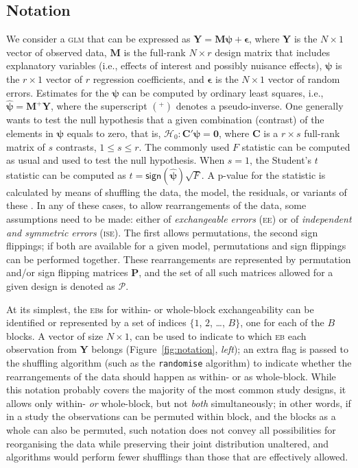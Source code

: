 \subsection{Notation}
\label{sec:ptree:notation}

We consider a \textsc{glm} that can be expressed as $\mathbf{Y} = \mathbf{M}\boldsymbol{\psi} + \boldsymbol{\epsilon}$, where $\mathbf{Y}$ is the $N \times 1$ vector of observed data, $\mathbf{M}$ is the full-rank $N \times r$ design matrix that includes explanatory variables (i.e., effects of interest and possibly nuisance effects), $\boldsymbol{\psi}$ is the $r \times 1$ vector of $r$ regression coefficients, and $\boldsymbol{\epsilon}$ is the $N \times 1$ vector of random errors. Estimates for the $\boldsymbol{\psi}$ can be computed by ordinary least squares, i.e., $\boldsymbol{\hat{\psi}} = \mathbf{M}^{+}\mathbf{Y}$, where the superscript $(^{+})$ denotes a pseudo-inverse. One generally wants to test the null hypothesis that a given combination (contrast) of the elements in $\boldsymbol{\psi}$ equals to zero, that is, $\mathcal{H}_{0} : \mathbf{C}'\boldsymbol{\psi} = \boldsymbol{0}$, where $\mathbf{C}$ is a $r \times s$ full-rank matrix of $s$ contrasts, $1 \leqslant s \leqslant r$. The commonly used $F$ statistic can be computed as usual and used to test the null hypothesis. When $s = 1$, the Student's $t$ statistic can be computed as $t=\mathsf{sign}(\boldsymbol{\hat{\psi}})\sqrt{F}$. A p-value for the statistic is calculated by means of shuffling the data, the model, the residuals, or variants of these \citep[Table~2]{Winkler2014}. In any of these cases, to allow rearrangements of the data, some assumptions need to be made: either of \emph{exchangeable errors} (\textsc{ee}) or of \emph{independent and symmetric errors} (\textsc{ise}). The first allows permutations, the second sign flippings; if both are available for a given model, permutations and sign flippings can be performed together. These rearrangements are represented by permutation and/or sign flipping matrices $\mathbf{P}$, and the set of all such matrices allowed for a given design is denoted as $\mathcal{P}$.

At its simplest, the \textsc{eb}s for within- or whole-block exchangeability can be identified or represented by a set of indices $\{1$, $2$, \ldots, $B\}$, one for each of the $B$ blocks. A vector of size $N \times 1$, can be used to indicate to which \textsc{eb} each observation from $\mathbf{Y}$ belongs (Figure~\ref{fig:notation}, \emph{left}); an extra flag is passed to the shuffling algorithm (such as the \texttt{randomise} algorithm) to indicate whether the rearrangements of the data should happen as within- or as whole-block. While this notation probably covers the majority of the most common study designs, it allows only within- \emph{or} whole-block, but not \emph{both} simultaneously; in other words, if in a study the observations can be permuted within block, and the blocks as a whole can also be permuted, such notation does not convey all possibilities for reorganising the data while preserving their joint distribution unaltered, and algorithms would perform fewer shufflings than those that are effectively allowed.

